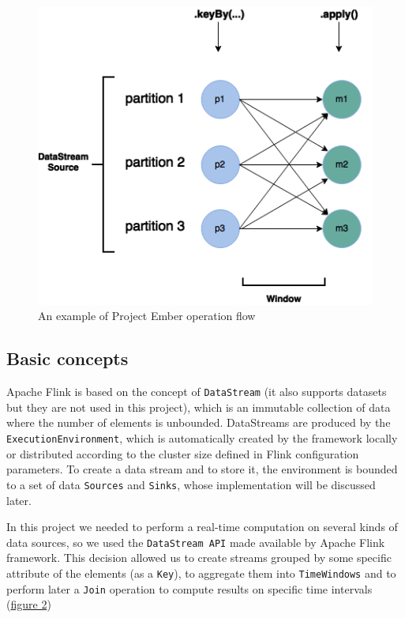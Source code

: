 \begin{figure}
\begin{center}
	\includegraphics[scale=0.40]{img/ember_keyedstream}
	\caption{An example of Project Ember operation flow}
	\label{fig:ember_operation_flow}
\end{center}
\end{figure}

\subsection{Basic concepts}
Apache Flink is based on the concept of \texttt{DataStream} (it also supports datasets but they are not used in this project), which is an immutable collection of data where the number of elements is unbounded. 
DataStreams are produced by the \texttt{ExecutionEnvironment}, which is automatically created by the framework locally or distributed according to the cluster size defined in Flink configuration parameters. To create a data stream and to store it, the environment is bounded to a set of data \texttt{Sources} and \texttt{Sinks}, whose implementation will be discussed later.

In this project we needed to perform a real-time computation on several kinds of data sources, so we used the \texttt{DataStream API} made available by Apache Flink framework. This decision allowed us to create streams grouped by some specific attribute of the elements (as a \texttt{Key}), to aggregate them into \texttt{TimeWindows} and to perform later a \texttt{Join} operation to compute results on specific time intervals (\hyperref[fig:ember_keyedstream]{figure 2})

